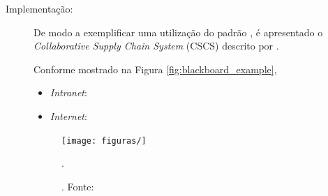 \begin{description}
\item[Implementação:] 

De modo a exemplificar uma utilização do padrão \textit{}, é apresentado o \textit{Collaborative
Supply Chain System} (CSCS) descrito por . 

Conforme mostrado na Figura \ref{fig:blackboard_example},
\begin{itemize}
    \item \textit{Intranet}:  
    \item \textit{Internet}:
\end{itemize}


\begin{figure}[h!]
    \centering
    \texttt{[image: figuras/]}
    \caption{. Fonte: \citeonline{}}.
    \label{fig:}
\end{figure}


\end{description}